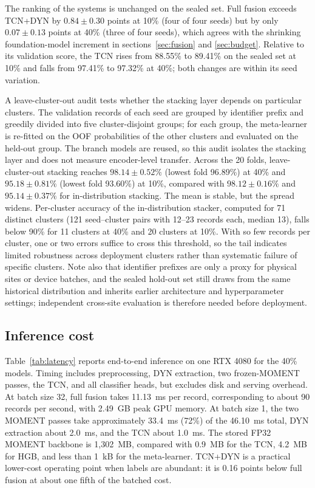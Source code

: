 \documentclass{iopjournal}
\begin{document}
The ranking of the systems is unchanged on the sealed set. Full fusion exceeds TCN+DYN by $0.84\pm0.30$ points at 10\% (four of four seeds) but by only $0.07\pm0.13$ points at 40\% (three of four seeds), which agrees with the shrinking foundation-model increment in sections~\ref{sec:fusion} and \ref{sec:budget}. Relative to its validation score, the TCN rises from 88.55\% to 89.41\% on the sealed set at 10\% and falls from 97.41\% to 97.32\% at 40\%; both changes are within its seed variation.

A leave-cluster-out audit tests whether the stacking layer depends on particular clusters. The validation records of each seed are grouped by identifier prefix and greedily divided into five cluster-disjoint groups; for each group, the meta-learner is re-fitted on the OOF probabilities of the other clusters and evaluated on the held-out group. The branch models are reused, so this audit isolates the stacking layer and does not measure encoder-level transfer. Across the 20 folds, leave-cluster-out stacking reaches $98.14\pm0.52\%$ (lowest fold 96.89\%) at 40\% and $95.18\pm0.81\%$ (lowest fold 93.60\%) at 10\%, compared with $98.12\pm0.16\%$ and $95.14\pm0.37\%$ for in-distribution stacking. The mean is stable, but the spread widens. Per-cluster accuracy of the in-distribution stacker, computed for 71 distinct clusters (121 seed--cluster pairs with 12--23 records each, median 13), falls below 90\% for 11 clusters at 40\% and 20 clusters at 10\%. With so few records per cluster, one or two errors suffice to cross this threshold, so the tail indicates limited robustness across deployment clusters rather than systematic failure of specific clusters. Note also that identifier prefixes are only a proxy for physical sites or device batches, and the sealed hold-out set still draws from the same historical distribution and inherits earlier architecture and hyperparameter settings; independent cross-site evaluation is therefore needed before deployment.

\subsection{Inference cost}\label{sec:latency}

Table~\ref{tab:latency} reports end-to-end inference on one RTX 4080 for the 40\% models. Timing includes preprocessing, DYN extraction, two frozen-MOMENT passes, the TCN, and all classifier heads, but excludes disk and serving overhead. At batch size 32, full fusion takes 11.13~ms per record, corresponding to about 90 records per second, with 2.49~GB peak GPU memory. At batch size 1, the two MOMENT passes take approximately 33.4~ms (72\%) of the 46.10~ms total, DYN extraction about 2.0~ms, and the TCN about 1.0~ms. The stored FP32 MOMENT backbone is 1,302~MB, compared with 0.9~MB for the TCN, 4.2~MB for HGB, and less than 1~kB for the meta-learner. TCN+DYN is a practical lower-cost operating point when labels are abundant: it is 0.16 points below full fusion at about one fifth of the batched cost.
\end{document}
